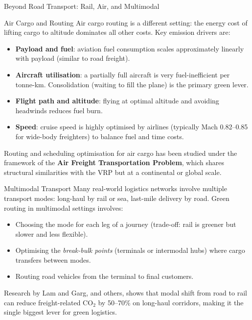 \documentclass[aspectratio=169,10pt]{beamer}
\begin{document}
\begin{frame}[allowframebreaks]{Beyond Road Transport: Rail, Air, and Multimodal}
  \framebreak

  \begin{block}{Air Cargo and Routing}
    Air cargo routing is a different setting: the energy cost of lifting cargo
    to altitude dominates all other costs.  Key emission drivers are:
    \begin{itemize}
      \item \textbf{Payload and fuel}: aviation fuel consumption scales
      approximately linearly with payload (similar to road freight).
      \item \textbf{Aircraft utilisation}: a partially full aircraft is very
      fuel-inefficient per tonne-km.  Consolidation (waiting to fill the plane)
      is the primary green lever.
      \item \textbf{Flight path and altitude}: flying at optimal altitude and
      avoiding headwinds reduces fuel burn.
      \item \textbf{Speed}: cruise speed is highly optimised by airlines
      (typically Mach 0.82--0.85 for wide-body freighters) to balance fuel
      and time costs.
    \end{itemize}
    Routing and scheduling optimisation for air cargo has been studied under the
    framework of the \textbf{Air Freight Transportation Problem}, which shares
    structural similarities with the VRP but at a continental or global scale.
  \end{block}

  \framebreak

  \begin{block}{Multimodal Transport}
    Many real-world logistics networks involve multiple transport modes:
    long-haul by rail or sea, last-mile delivery by road.
    Green routing in multimodal settings involves:
    \begin{itemize}
      \item Choosing the mode for each leg of a journey (trade-off:
      rail is greener but slower and less flexible).
      \item Optimising the \emph{break-bulk points} (terminals or
      intermodal hubs) where cargo transfers between modes.
      \item Routing road vehicles from the terminal to final customers.
    \end{itemize}
    Research by Lam and Garg, and others, shows that modal shift
    from road to rail can reduce freight-related CO$_2$ by 50--70\% on
    long-haul corridors, making it the single biggest lever for green logistics.
  \end{block}

\end{frame}
\end{document}
